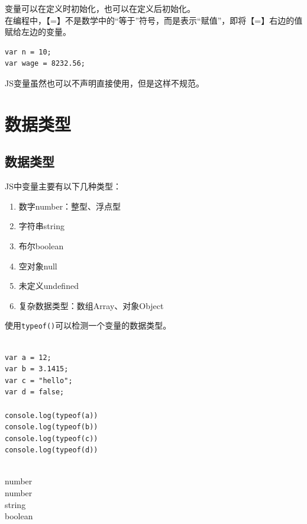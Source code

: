 变量可以在定义时初始化，也可以在定义后初始化。 \\

在编程中，【=】不是数学中的“等于”符号，而是表示“赋值”，即将【=】右边的值赋给左边的变量。 \\

\begin{lstlisting}[style=htmlcssjs]
var n = 10;
var wage = 8232.56;
\end{lstlisting}

JS变量虽然也可以不声明直接使用，但是这样不规范。

\newpage

\section{数据类型}

\subsection{数据类型}

JS中变量主要有以下几种类型：

\begin{enumerate}
	\item 数字number：整型、浮点型
	\item 字符串string
	\item 布尔boolean
	\item 空对象null
	\item 未定义undefined
	\item 复杂数据类型：数组Array、对象Object
\end{enumerate}

使用\lstinline|typeof()|可以检测一个变量的数据类型。 \\

 \\

\begin{lstlisting}[style=htmlcssjs]
var a = 12;
var b = 3.1415;
var c = "hello";
var d = false;

console.log(typeof(a))
console.log(typeof(b))
console.log(typeof(c))
console.log(typeof(d))
\end{lstlisting}

\begin{tcolorbox}
	 \\
	number \\
	number \\
	string \\
	boolean
\end{tcolorbox}

